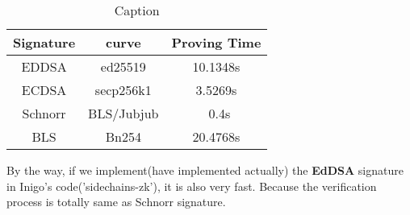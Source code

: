\documentclass{article}
\begin{document}
\begin{table}[H]
    \centering
    \begin{tabular}{c|c|c} \hline
         Signature& curve& Proving Time   \\ \hline
         EDDSA& ed25519 & 10.1348s \\ \hline
         ECDSA& secp256k1&3.5269s \\ \hline
         Schnorr& BLS/Jubjub & ~0.4s\\ \hline
         BLS & Bn254 & 20.4768s \\ \hline
    \end{tabular}
    \caption{Caption}
    \label{tab:my_label}
\end{table}

By the way, if we implement(have implemented actually) the\textbf{ EdDSA} signature in Inigo's code('sidechains-zk'), it is also very fast. Because the verification process is totally same as Schnorr signature.
\end{document}
